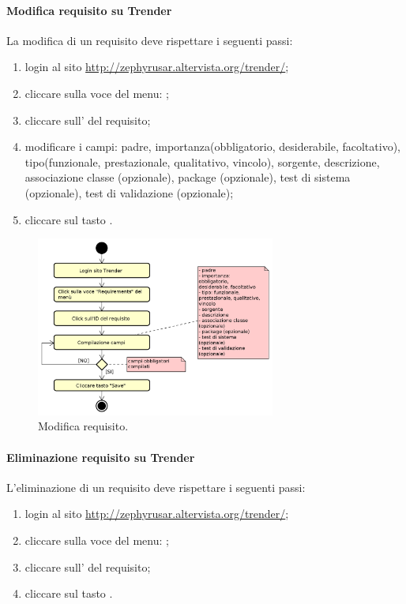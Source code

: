 		\paragraph{Modifica requisito su Trender}
		La modifica di un requisito deve rispettare i seguenti passi:
		\begin{enumerate}
			\item login al sito \url{http://zephyrusar.altervista.org/trender/};
			\item cliccare sulla voce del menu: ;
	    	\item cliccare sull' del requisito;	
			\item modificare i campi: padre, importanza(obbligatorio, desiderabile, facoltativo), tipo(funzionale, prestazionale, qualitativo, vincolo), sorgente, descrizione, associazione classe (opzionale), package (opzionale), test di sistema (opzionale), test di validazione (opzionale);
			\item cliccare sul tasto .
		\end{enumerate}
		\begin{figure}[H]
			\centering
			\includegraphics[width=0.7\textwidth]{img/ModificaReq}
			\caption{Modifica requisito.}
		\end{figure}
	
		\paragraph{Eliminazione requisito su Trender}
		L'eliminazione di un requisito deve rispettare i seguenti passi:
		\begin{enumerate}
			\item login al sito \url{http://zephyrusar.altervista.org/trender/};
			\item cliccare sulla voce del menu: ;
			\item cliccare sull' del requisito;
			\item cliccare sul tasto .
		\end{enumerate}

